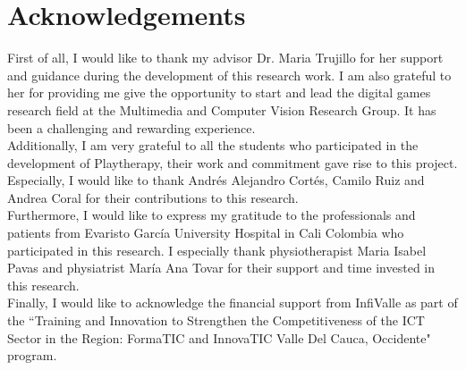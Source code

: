 



\begingroup

\let\clearpage\relax
\let\cleardoublepage\relax
\let\cleardoublepage\relax

\chapter*{Acknowledgements} %

\noindent First of all, I would like to thank my advisor Dr. Maria Trujillo for her support and guidance during the development of this research work. I am also grateful to her for providing me give the opportunity to start and lead the digital games research field at the Multimedia and Computer Vision Research Group. It has been a challenging and rewarding experience.\\

\noindent Additionally, I am very grateful to all the students who participated in the development of Playtherapy, their work and commitment gave rise to this project. Especially, I would like to thank Andr\'es Alejandro Cort\'es, Camilo Ruiz and Andrea Coral for their contributions to this research.\\

\noindent Furthermore, I would like to express my gratitude to the professionals and patients from Evaristo Garc\'ia University Hospital in Cali Colombia who participated in this research. I especially thank physiotherapist Maria Isabel Pavas and physiatrist Mar\'ia Ana Tovar for their support and time invested in this research.\\

\noindent Finally, I would like to acknowledge the financial support from InfiValle as part of the “Training and Innovation to Strengthen the Competitiveness of the ICT Sector in the Region: FormaTIC and InnovaTIC Valle Del Cauca, Occidente" program.\\

\endgroup

